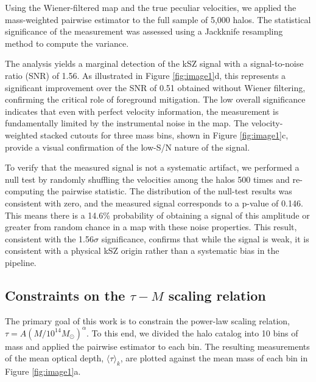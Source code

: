 \documentclass[]{article}
\begin{document}
Using the Wiener-filtered map and the true peculiar velocities, we applied the mass-weighted pairwise estimator to the full sample of 5,000 halos. The statistical significance of the measurement was assessed using a Jackknife resampling method to compute the variance.

The analysis yields a marginal detection of the kSZ signal with a signal-to-noise ratio (SNR) of 1.56. As illustrated in Figure \ref{fig:image1}d, this represents a significant improvement over the SNR of 0.51 obtained without Wiener filtering, confirming the critical role of foreground mitigation. The low overall significance indicates that even with perfect velocity information, the measurement is fundamentally limited by the instrumental noise in the map. The velocity-weighted stacked cutouts for three mass bins, shown in Figure \ref{fig:image1}c, provide a visual confirmation of the low-S/N nature of the signal.

To verify that the measured signal is not a systematic artifact, we performed a null test by randomly shuffling the velocities among the halos 500 times and re-computing the pairwise statistic. The distribution of the null-test results was consistent with zero, and the measured signal corresponds to a p-value of 0.146. This means there is a 14.6\% probability of obtaining a signal of this amplitude or greater from random chance in a map with these noise properties. This result, consistent with the 1.56$\sigma$ significance, confirms that while the signal is weak, it is consistent with a physical kSZ origin rather than a systematic bias in the pipeline.

\subsection{Constraints on the $\tau-M$ scaling relation}

The primary goal of this work is to constrain the power-law scaling relation, $\tau = A (M / 10^{14} M_\odot)^\alpha$. To this end, we divided the halo catalog into 10 bins of mass and applied the pairwise estimator to each bin. The resulting measurements of the mean optical depth, $\langle \tau \rangle_k$, are plotted against the mean mass of each bin in Figure \ref{fig:image1}a.
\end{document}
